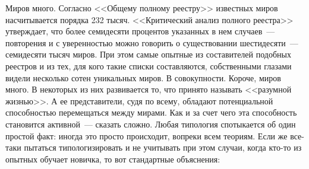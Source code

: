 Миров много. Согласно <<Общему полному реестру>> известных миров насчитывается 
порядка 232 тысяч. <<Критический анализ полного реестра>> утверждает, что более 
семидесяти процентов указанных в нем случаев~--- повторения и с уверенностью 
можно 
говорить о существовании шестидесяти~--- семидесяти тысяч миров. При этом самые 
опытные из составителей подобных реестров и из тех, для кого такие списки 
составляются, собственными глазами видели несколько сотен уникальных миров. В 
совокупности. Короче, миров много. В некоторых из них развивается то, что 
принято называть <<разумной жизнью>>. А ее представители, судя по всему, 
обладают 
потенциальной способностью перемещаться между мирами.
Как и за счет чего эта способность становится активной~--- сказать сложно. 
Любая 
типология спотыкается об один простой факт: иногда это просто происходит, 
вопреки всем теориям. Если же все-таки пытаться типологизировать и не учитывать 
при этом случаи, когда кто-то из опытных обучает новичка, то вот стандартные 
объяснения:
